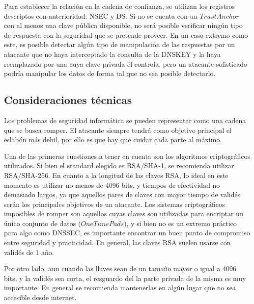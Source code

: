 Para establecer la relación en la cadena de confianza, se utilizan los registros descriptos con anterioridad: NSEC y DS. Si no se cuenta con un $Trust Anchor$ con al menos una clave pública disponible, no será posible verificar ningún tipo de respuesta con la seguridad que se pretende proveer. En un caso extremo como este, es posible detectar algún tipo de manipulación de las respuestas por un atacante que no haya interceptado la consulta de la DNSKEY y la haya reemplazado por una cuya clave privada él controla, pero un atacante sofisticado podría manipular los datos de forma tal que no sea posible detectarlo.

\subsection{Consideraciones técnicas}

Los problemas de seguridad informática se pueden representar como una cadena que se busca romper. El atacante siempre tendrá como objetivo principal el eslabón más debil, por ello es que hay que cuidar cada parte al máximo.

Una de las primeras cuestiones a tener en cuenta son los algoritmos criptográficos utilizados. Si bien el standard elegido es RSA/SHA-1, se recomienda utilizar RSA/SHA-256. En cuanto a la longitud de las claves RSA, lo ideal en este momento es utilizar no menos de 4096 bits, y tiempos de efectividad no demasiado largos, ya que aquellos pares de claves con mayor tiempo de validés serán los principales objetivos de un atacante. Los sistemas criptográficos imposibles de romper son aquellos cuyas claves son utilizadas para encriptar un único conjunto de datos ($One Time Pads$), y si bien no es un extremo práctico para algo como DNSSEC, es importante encontrar un buen punto de compromiso entre seguridad y practicidad. En general, las claves RSA suelen usarse con validés de 1 año.

Por otro lado, aun cuando las llaves sean de un tamaño mayor o igual a 4096 bits, y la validés sea corta, el resguardo del la parte privada de la misma es muy importante. En general se recomienda mantenerlas en algún lugar que no sea accesible desde internet.
